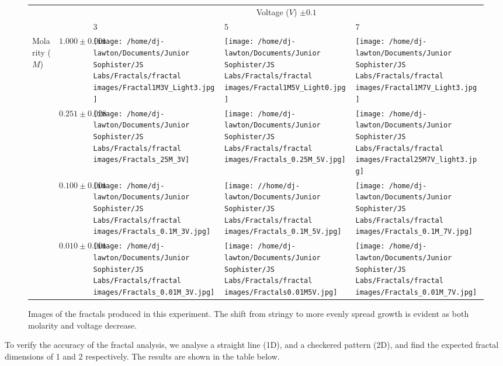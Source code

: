 \documentclass{article}
\theoremstyle{definition}
\theoremstyle{remark}
\begin{document}
\begin{figure}[H]
        \centering
        \begin{tabular}{|ll|l|l|l|}
        \hline
             ~& ~& \multicolumn{3}{c|}{Voltage ($V$) $\pm0.1$} \\ \cline{3-5}
             ~& ~& 3 & 5 & 7 \\ \hline
            \multirow{4}{*}{Molarity ($M$)} & $1.000\pm0.001$ & \texttt{[image: /home/dj-lawton/Documents/Junior Sophister/JS Labs/Fractals/fractal images/Fractal1M3V\_Light3.jpg]} & \texttt{[image: /home/dj-lawton/Documents/Junior Sophister/JS Labs/Fractals/fractal images/Fractal1M5V\_Light0.jpg]} & \texttt{[image: /home/dj-lawton/Documents/Junior Sophister/JS Labs/Fractals/fractal images/Fractal1M7V\_Light3.jpg]} \\ \cline{2-5}
            & $0.251\pm0.028$ & \texttt{[image: /home/dj-lawton/Documents/Junior Sophister/JS Labs/Fractals/fractal images/Fractals\_25M\_3V]} & \texttt{[image: /home/dj-lawton/Documents/Junior Sophister/JS Labs/Fractals/fractal images/Fractals\_0.25M\_5V.jpg]} & \texttt{[image: /home/dj-lawton/Documents/Junior Sophister/JS Labs/Fractals/fractal images/Fractal25M7V\_light3.jpg]} \\     \cline{2-5}
            & $0.100\pm0.001$ & \texttt{[image: /home/dj-lawton/Documents/Junior Sophister/JS Labs/Fractals/fractal images/Fractals\_0.1M\_3V.jpg]} & \texttt{[image: //home/dj-lawton/Documents/Junior Sophister/JS Labs/Fractals/fractal images/Fractals\_0.1M\_5V.jpg]} & \texttt{[image: /home/dj-lawton/Documents/Junior Sophister/JS Labs/Fractals/fractal images/Fractals\_0.1M\_7V.jpg]} \\ \cline{2-5}
            & $0.010\pm0.001$ & \texttt{[image: /home/dj-lawton/Documents/Junior Sophister/JS Labs/Fractals/fractal images/Fractals\_0.01M\_3V.jpg]} & \texttt{[image: /home/dj-lawton/Documents/Junior Sophister/JS Labs/Fractals/fractal images/Fractals0.01M5V.jpg]} & \texttt{[image: /home/dj-lawton/Documents/Junior Sophister/JS Labs/Fractals/fractal images/Fractals\_0.01M\_7V.jpg]} \\ \hline
        \end{tabular}
        \caption{\label{fig:fractal images}Images of the fractals produced in this experiment. The shift from stringy to more evenly spread growth is evident as both molarity and voltage decrease.}
\end{figure}
To verify the accuracy of the fractal analysis, we analyse a straight line (1D), and a checkered pattern (2D), and find the expected fractal dimensions of 1 and 2 respectively. The results are shown in the table below.\\
\end{document}
